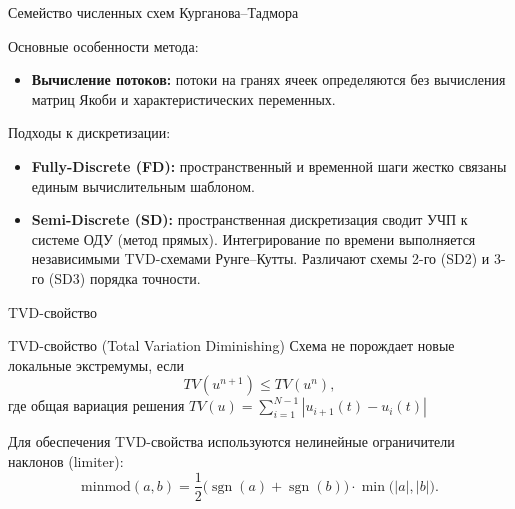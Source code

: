\documentclass[ignoreonframetext,unicode,aspectratio=169]{beamer}
\begin{document}
	\begin{frame}{Семейство численных схем Курганова--Тадмора}

		\begin{block}{Основные особенности метода:}
			\begin{itemize}
				\item \textbf{Вычисление потоков:} потоки на гранях ячеек определяются без вычисления матриц Якоби и характеристических переменных.
			\end{itemize}
		\end{block}

		\begin{block}{Подходы к дискретизации:}
			\begin{itemize}
				\item \textbf{Fully-Discrete (FD):} пространственный и временной шаги жестко связаны единым вычислительным шаблоном.
				\item \textbf{Semi-Discrete (SD):} пространственная дискретизация сводит УЧП к системе ОДУ (метод прямых). Интегрирование по времени выполняется независимыми TVD-схемами Рунге--Кутты. Различают схемы 2-го (SD2) и 3-го (SD3) порядка точности.
			\end{itemize}
		\end{block}

	\end{frame}

	\begin{frame}{TVD-свойство}

		\begin{block}{TVD-свойство (Total Variation Diminishing)}
			Схема не порождает новые локальные экстремумы, если
			\vspace{-0.2 cm}
			\[
			TV(u^{n+1}) \leq TV(u^{n}),
			\]
			где общая вариация решения $TV(u) = \sum_{i = 1}^{N - 1} |u_{i + 1}(t) - u_i(t)|$
		\end{block}

		Для обеспечения TVD-свойства используются нелинейные ограничители наклонов (limiter):
		\vspace{-0.3 cm}
		\[
		\text{minmod}(a,b) = \frac{1}{2} \big( \operatorname{sgn}(a) + \operatorname{sgn}(b) \big) \cdot \min\big( |a|, |b| \big).
		\]
	\end{frame}
\end{document}
